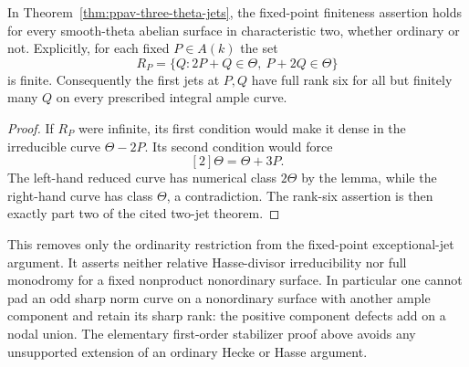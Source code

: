 \begin{corollary}
\label{cor:all-theta-fixed-point-jets-candidate}
In Theorem~\ref{thm:ppav-three-theta-jets}, the fixed-point
finiteness assertion holds for every smooth-theta abelian
surface in characteristic two, whether ordinary or not.
Explicitly, for each fixed $P\in A(k)$ the set
\[
 R_P=\{Q:2P+Q\in\Theta,\ P+2Q\in\Theta\}
\]
is finite. Consequently the first jets at $P,Q$ have full
rank six for all but finitely many $Q$ on every prescribed
integral ample curve.
\end{corollary}
\begin{proof}
If $R_P$ were infinite, its first condition would make it
dense in the irreducible curve $\Theta-2P$. Its second
condition would force
\[
                          [2]\Theta=\Theta+3P.
\]
The left-hand reduced curve has numerical class $2\Theta$
by the lemma, while the right-hand curve has class
$\Theta$, a contradiction. The rank-six assertion is
then exactly part two of the cited two-jet theorem.
\end{proof}

\begin{remark}[Scope]
\label{rem:all-theta-fixed-point-jets-scope-candidate}
This removes only the ordinarity restriction from the
fixed-point exceptional-jet argument. It asserts neither
relative Hasse-divisor irreducibility nor full monodromy
for a fixed nonproduct nonordinary surface. In particular
one cannot pad an odd sharp norm curve on a nonordinary
surface with another ample component and retain its sharp
rank: the positive component defects add on a nodal union.
The elementary first-order stabilizer proof above avoids
any unsupported extension of an ordinary Hecke or Hasse
argument.
\end{remark}
